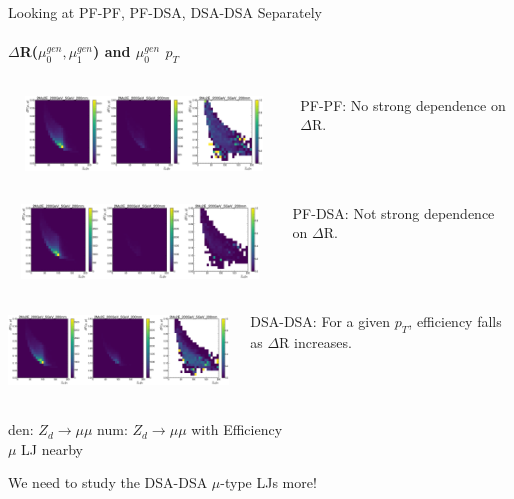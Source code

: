 \documentclass{beamer}
\begin{document}
\begin{frame}{Looking at PF-PF, PF-DSA, DSA-DSA Separately}
\framesubtitle{$\Delta$R($\mu^{gen}_0, \mu^{gen}_1$) and $\mu_0^{gen}$ $p_T$ }
\footnotesize
\begin{columns}
\begin{column}{.7\textwidth}
\includegraphics[width =8cm, height =2cm]{zd_mumu_pt_dR_5_pf.png}\\

\end{column}
\begin{column}{.3\textwidth}
\textcolor{UniBlue}{PF-PF:} No strong dependence on $\Delta$R.
\end{column}
\end{columns}

\begin{columns}
\begin{column}{.7\textwidth}
\includegraphics[width =8cm, height =2cm]{zd_mumu_pt_dR_5_1dsa1pf.png}\\
\end{column}
\begin{column}{.3\textwidth}
\textcolor{UniBlue}{PF-DSA:} Not strong dependence on $\Delta$R.
\end{column}
\end{columns}
\begin{columns}
\begin{column}{.7\textwidth}
\includegraphics[width =8cm, height =2cm]{zd_mumu_pt_dR_5_2dsa.png}\\
\end{column}
\begin{column}{.3\textwidth}
\textcolor{UniBlue}{DSA-DSA:} For a given $p_T$, efficiency falls as $\Delta$R increases.
\end{column}
\end{columns}
{\tiny \textcolor{uvaorange}{\hspace{12pt}den: $Z_d\rightarrow\mu\mu$ \hspace{25pt } num: $Z_d\rightarrow\mu\mu$ with \hspace{1cm} Efficiency\\
\vspace{-5pt}
\hspace{ 3cm } $\mu$ LJ nearby}}

We need to study the DSA-DSA $\mu$-type LJs more!

\end{frame}
\end{document}
